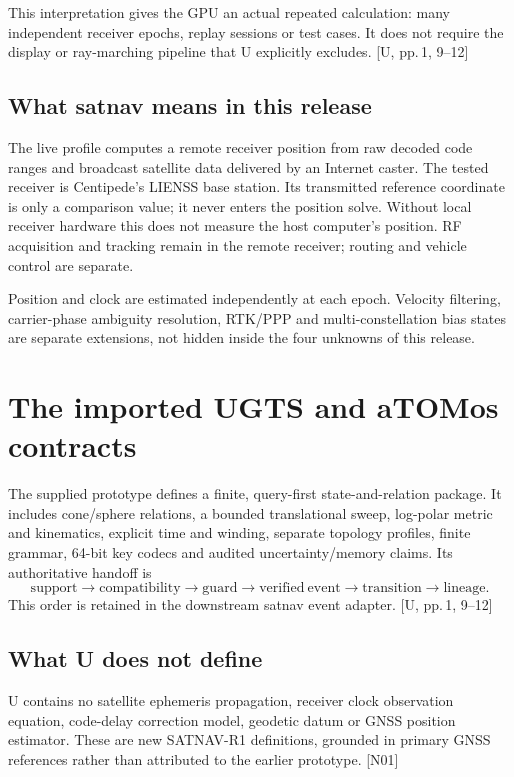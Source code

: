 \documentclass[11pt,a4paper]{article}
\newcommand{\src}[1]{\textcolor{muted}{[U, #1]}}
\newcommand{\dec}[1]{\textcolor{accent}{[N#1]}}
\begin{document}
This interpretation gives the GPU an actual repeated calculation: many independent
receiver epochs, replay sessions or test cases. It does not require the display or
ray-marching pipeline that U explicitly excludes. \src{pp.\,1, 9--12}

\subsection*{What satnav means in this release}
The live profile computes a remote receiver position from raw decoded code ranges
and broadcast satellite data delivered by an Internet caster. The tested receiver
is Centipede's LIENSS base station. Its transmitted reference coordinate is only a
comparison value; it never enters the position solve. Without local receiver
hardware this does not measure the host computer's position. RF acquisition and
tracking remain in the remote receiver; routing and vehicle control are separate.

Position and clock are estimated independently at each epoch. Velocity filtering,
carrier-phase ambiguity resolution, RTK/PPP and multi-constellation bias states are
separate extensions, not hidden inside the four unknowns of this release.
\clearpage
\tableofcontents
\clearpage




\section{The imported UGTS and aTOMos contracts}
The supplied prototype defines a finite, query-first state-and-relation package. It
includes cone/sphere relations, a bounded translational sweep, log-polar metric and
kinematics, explicit time and winding, separate topology profiles, finite grammar,
64-bit key codecs and audited uncertainty/memory claims. Its authoritative handoff is
\begin{equation}
\mathrm{support}\to\mathrm{compatibility}\to\mathrm{guard}\to\mathrm{verified\ event}
\to\mathrm{transition}\to\mathrm{lineage}.
\end{equation}
This order is retained in the downstream satnav event adapter. \src{pp.\,1, 9--12}

\subsection{What U does not define}
U contains no satellite ephemeris propagation, receiver clock observation equation,
code-delay correction model, geodetic datum or GNSS position estimator. These are
new SATNAV-R1 definitions, grounded in primary GNSS references rather than attributed
to the earlier prototype. \dec{01}
\end{document}
